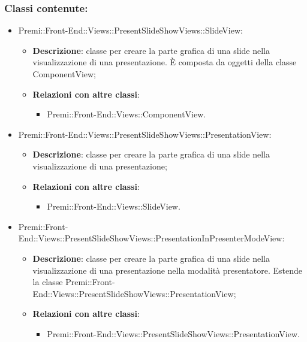 	\subsubsection*{Classi contenute:}
		\begin{itemize}
			\item Premi::Front-End::Views::PresentSlideShowViews::SlideView:
			\begin{itemize}
				\item \textbf{Descrizione}: classe per creare la parte grafica di una \gls{slide} nella visualizzazione di una presentazione. È composta da oggetti della classe ComponentView;
				\item \textbf{Relazioni con altre classi}:
				\begin{itemize}
					\item Premi::Front-End::Views::ComponentView.
				\end{itemize}
			\end{itemize}
				\item Premi::Front-End::Views::PresentSlideShowViews::PresentationView:
				\begin{itemize}
					\item \textbf{Descrizione}: classe per creare la parte grafica di una \gls{slide} nella visualizzazione di una presentazione;
					\item \textbf{Relazioni con altre classi}:
					\begin{itemize}
						\item Premi::Front-End::Views::SlideView.
					\end{itemize}
				\end{itemize}

			\item Premi::Front-End::Views::PresentSlideShowViews::PresentationInPresenterModeView:
			\begin{itemize}
				\item \textbf{Descrizione}: classe per creare la parte grafica di una \gls{slide} nella visualizzazione di una presentazione nella modalità presentatore. Estende la classe Premi::Front-End::Views::PresentSlideShowViews::PresentationView;
				\item \textbf{Relazioni con altre classi}:
				\begin{itemize}
					\item Premi::Front-End::Views::PresentSlideShowViews::PresentationView.
				\end{itemize}
			\end{itemize}
		\end{itemize}

